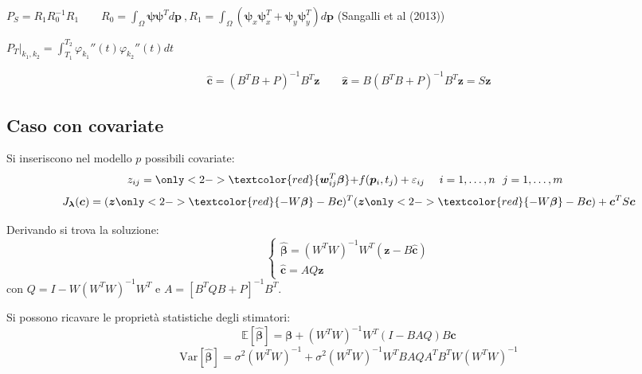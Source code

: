\documentclass[landscape,9pt]{beamer}                           %
\begin{document}
\begin{frame}
{\begin{itemize}
{
\item $P_S=R_1 R_0^{-1} R_1 \qquad R_0 = \int_\Omega \bm \psi \bm \psi^T d \bm p \ , R_1 = \int_\Omega (\bm \psi_x \bm \psi_x^T + \bm \psi_y \bm \psi_y^T)d \bm p$ (Sangalli et al (2013))
\item $P_T|_{k_1,k_2} =\int_{T_1}^{T_2} \varphi_{k_1}''(t) \varphi_{k_2}''(t) dt$
}
\end{itemize}
}
\par\bigskip
{}
{
$$
\boxed{\hat  {\bm c} = (B^T B + P)^{-1}B^T \bm z}
\qquad
\hat  {\bm z} = B(B^T B + P)^{-1}B^T \bm z = S\bm z
$$
}

\end{frame}


\subsection{Caso con covariate}
\begin{frame}
Si inseriscono nel modello $p$ possibili covariate:
$$
z_{ij}=\only<2->{\textcolor{red}{\bm w_{ij}^T \bm{\beta}} + } f(\bm{p}_i,t_j)+\varepsilon_{ij}\ \ \ \ i = 1,\ldots,n\ \ j=1,\ldots,m \ \ 
$$
$$
J_{\bm \lambda }(\bm c) = (\bm z \only<2->{\textcolor{red}{- W \bm \beta}} - B \bm c)^T (\bm z \only<2->{\textcolor{red}{- W \bm \beta}} - B \bm c) + \bm c^T S \bm c
$$
\uncover<3->
{
Derivando si trova la soluzione:
$$
\boxed{\begin{cases}
\hat{\bm \beta} = (W^TW)^{-1}W^T(\bm z - B \hat{\bm c}) \\
\hat  {\bm c} = AQ \bm z
\end{cases}}
$$
con $Q=I-W(W^TW)^{-1}W^T $ e $A=[B^TQB+P]^{-1}B^T$.
\par\bigskip
}
{
Si possono ricavare le proprietà statistiche degli stimatori:
$$
\mathbb{E}[\hat  {\bm \beta}] = \bm \beta + (W^TW)^{-1}W^T(I-B AQ)B\bm c
$$
$$
\mathrm{Var}[\hat  {\bm \beta}] = \sigma^2 (W^TW)^{-1} + \sigma^2 (W^TW)^{-1}W^T B A Q A^T B^T W(W^TW)^{-1}
$$
}
\end{frame}
\end{document}
